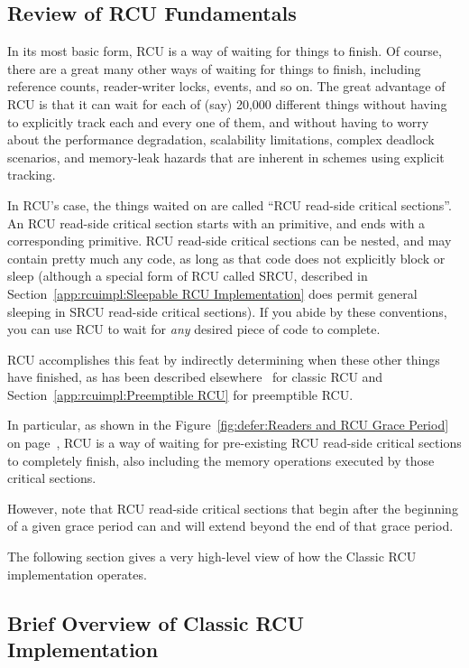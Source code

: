 \subsection{Review of RCU Fundamentals}
\label{app:rcuimpl:rcutree:Review of RCU Fundamentals}

In its most basic form, RCU is a way of waiting for things to finish.
Of course, there are a great many other ways of waiting for things to
finish, including reference counts, reader-writer locks, events, and so on.
The great advantage of RCU is that it can wait for each of
(say) 20,000 different things without having to explicitly
track each and every one of them, and without having to worry about
the performance degradation, scalability limitations, complex deadlock
scenarios, and memory-leak hazards that are inherent in schemes
using explicit tracking.

In RCU's case, the things waited on are called
``RCU read-side critical sections''.
An RCU read-side critical section starts with an
 primitive, and ends with a corresponding
 primitive.
RCU read-side critical sections can be nested, and may contain pretty
much any code, as long as that code does not explicitly block or sleep
(although a special form of RCU called SRCU, described in
Section~\ref{app:rcuimpl:Sleepable RCU Implementation}
does permit general sleeping in SRCU read-side critical sections).
If you abide by these conventions, you can use RCU to wait for \emph{any}
desired piece of code to complete.

RCU accomplishes this feat by indirectly determining when these
other things have finished, as has been described
elsewhere~\cite{McKenney98}
for classic RCU and
Section~\ref{app:rcuimpl:Preemptible RCU} for preemptible RCU.

In particular, as shown in the
Figure~\ref{fig:defer:Readers and RCU Grace Period} on
page~\pageref{fig:defer:Readers and RCU Grace Period},
RCU is a way of
waiting for pre-existing RCU read-side critical sections to completely
finish, also including the memory operations executed
by those critical sections.

However, note that RCU read-side critical sections
that begin after the beginning
of a given grace period can and will extend beyond the end of that grace
period.

The following section gives a very high-level view of how
the Classic RCU implementation operates.

\subsection{Brief Overview of Classic RCU Implementation}
\label{app:rcuimpl:rcutree:Brief Overview of Classic RCU Implementation}

